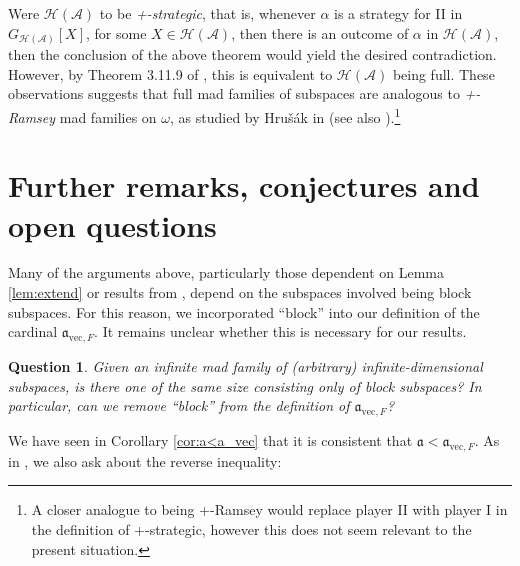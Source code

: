 \documentclass[11pt]{amsart}
\newcommand{\LP}{\mathcal{P}}
\newcommand{\LA}{\mathcal{A}}
\newcommand{\LI}{\mathcal{I}}
\renewcommand{\a}{\mathfrak{a}}
\DeclareMathOperator{\ran}{ran}
\newtheorem*{ques}{Question}
\theoremstyle{definition}
\theoremstyle{remark}
\newcommand{\LH}{\mathcal{H}}
\newcommand{\concat}{^\smallfrown}
\renewcommand{\1}{\mathbf{1}}
\begin{document}
Were $\LH(\LA)$ to be \emph{+-strategic}, that is, whenever $\alpha$ is a strategy for II in $G_{\LH(\LA)}[X]$, for some $X\in\LH(\LA)$, then there is an outcome of $\alpha$ in $\LH(\LA)$, then the conclusion of the above theorem would yield the desired contradiction. However, by Theorem 3.11.9 of \cite{Smythe_thesis}, this is equivalent to $\LH(\LA)$ being full. These observations suggests that full mad families of subspaces are analogous to \emph{+-Ramsey} mad families on $\omega$, as studied by Hru{\v{s}}{\'{a}}k in \cite{MR1802331} (see also \cite{MR3631288}).\footnote{A closer analogue to being +-Ramsey would replace player II with player I in the definition of +-strategic, however this does not seem relevant to the present situation.}%



\section{Further remarks, conjectures and open questions}\label{sec:fin}

Many of the arguments above, particularly those dependent on Lemma \ref{lem:extend} or results from \cite{MR3685044}, depend on the subspaces involved being block subspaces. For this reason, we incorporated ``block'' into our definition of the cardinal $\a_{\mathrm{vec},F}$. It remains unclear whether this is necessary for our results.

\begin{ques}
	Given an infinite mad family of (arbitrary) infinite-dimensional subspaces, is there one of the same size consisting only of block subspaces? In particular, can we remove ``block'' from the definition of $\a_{\mathrm{vec},F}$?
\end{ques}

We have seen in Corollary \ref{cor:a<a_vec} that it is consistent that $\a<\a_{\mathrm{vec},F}$. As in \cite{MR3685044}, we also ask about the reverse inequality:
\end{document}
